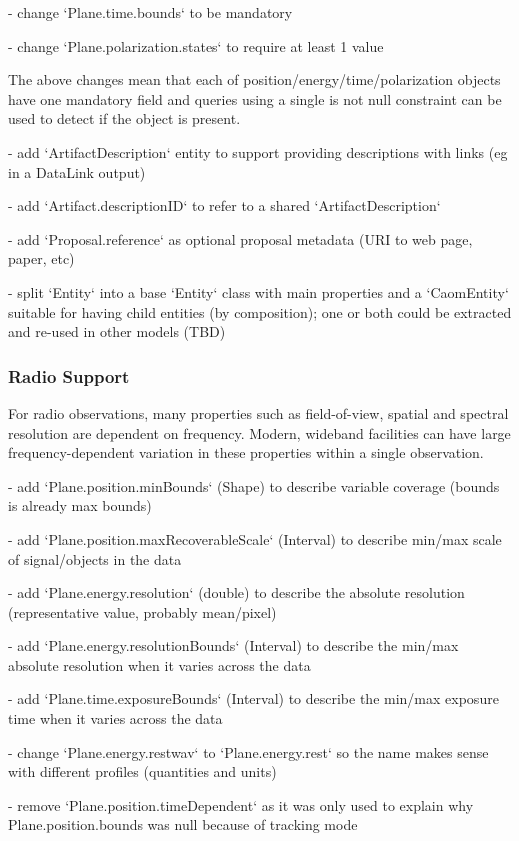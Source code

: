 \documentclass[11pt,a4paper]{ivoa}
\begin{document}
- change `Plane.time.bounds` to be mandatory

- change `Plane.polarization.states` to require at least 1 value

The above changes mean that each of position/energy/time/polarization objects 
have one mandatory field and queries using a single is not null constraint
can be used to detect if the object is present.

- add `ArtifactDescription` entity to support providing descriptions with links 
(eg in a DataLink output)

- add `Artifact.descriptionID` to refer to a shared `ArtifactDescription`

- add `Proposal.reference` as optional proposal metadata (URI to web page, paper, etc)

- split `Entity` into a base `Entity` class with main properties and a `CaomEntity` 
suitable for having child entities (by composition); one or both could be extracted 
and re-used in other models (TBD)

\subsubsection{Radio Support}

For radio observations, many properties such as field-of-view, spatial and spectral resolution are dependent on frequency. Modern,
 wideband facilities can have large frequency-dependent variation in these properties within a single observation.

- add `Plane.position.minBounds` (Shape) to describe variable coverage (bounds is already max bounds)

- add `Plane.position.maxRecoverableScale` (Interval) to describe min/max scale of signal/objects in the data

- add `Plane.energy.resolution` (double) to describe the absolute resolution (representative value, probably mean/pixel)

- add `Plane.energy.resolutionBounds` (Interval) to describe the min/max absolute resolution when it varies across the data

- add `Plane.time.exposureBounds` (Interval) to describe the min/max exposure time when it varies across the data

- change `Plane.energy.restwav` to `Plane.energy.rest` so the name makes sense with different profiles (quantities and units)

- remove `Plane.position.timeDependent` as it was only used to explain why Plane.position.bounds was null because of tracking mode
\end{document}
